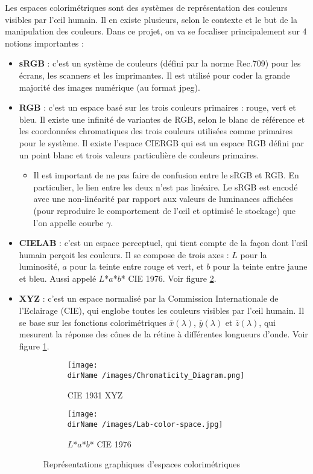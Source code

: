 Les espaces colorimétriques sont des systèmes de représentation des couleurs visibles par l'œil humain. Il en existe plusieurs, selon le contexte et le but de la manipulation des couleurs. Dans ce projet, on va se focaliser principalement sur 4 notions importantes :
\begin{itemize}
\item  \textbf{sRGB} : c'est un système de couleurs (défini par la norme Rec.709) pour les écrans, les scanners et les imprimantes. Il est utilisé pour coder la grande majorité des images numérique (au format jpeg).
\item  \textbf{RGB} : c'est un espace basé sur les trois couleurs primaires : rouge, vert et bleu. Il existe une infinité de variantes de RGB, selon le blanc de référence et les coordonnées chromatiques des trois couleurs utilisées comme primaires pour le système. Il existe l'espace CIERGB qui est un espace RGB défini par un point blanc et trois valeurs particulière de couleurs primaires. 

\begin{itemize}
	\item Il est important de ne pas faire de confusion entre le sRGB et RGB. En particulier, le lien entre les deux n'est pas linéaire. Le sRGB est encodé avec une non-linéarité par rapport aux valeurs de luminances affichées (pour reproduire le comportement de l'œil et optimisé le stockage) que l'on appelle courbe $\gamma$. 
\end{itemize}

\item  \textbf{CIELAB} : c'est un espace perceptuel, qui tient compte de la façon dont l'œil humain perçoit les couleurs. Il se compose de trois axes : $L$ pour la luminosité, $a$ pour la teinte entre rouge et vert, et $b$ pour la teinte entre jaune et bleu. Aussi appelé $L$*$a$*$b$* CIE 1976. Voir figure \ref{Lab}.
\item \textbf{XYZ} : c'est un espace normalisé par la Commission Internationale de l'Eclairage (CIE), qui englobe toutes les couleurs visibles par l'œil humain. Il se base sur les fonctions colorimétriques $\bar{x}(\lambda)$, $\bar{y}(\lambda)$ et $\bar{z}(\lambda)$, qui mesurent la réponse des cônes de la rétine à différentes longueurs d'onde. Voir figure \ref{XYZ}.

\begin{figure}[h]
	\centering
	\begin{subfigure}[b]{0.4\textwidth}
		\centering
		\texttt{[image: \\dirName /images/Chromaticity\_Diagram.png]}
		\caption{CIE 1931 XYZ}
		\label{XYZ}
	\end{subfigure}
	\hfill
	\begin{subfigure}[b]{0.59\textwidth}
		\centering
		\texttt{[image: \\dirName /images/Lab-color-space.jpg]}
		\caption{$L$*$a$*$b$* CIE 1976}
		\label{Lab}
	\end{subfigure}

\caption{Représentations graphiques d'espaces colorimétriques}
\label{fig:three graphs}
\end{figure}


\end{itemize}


